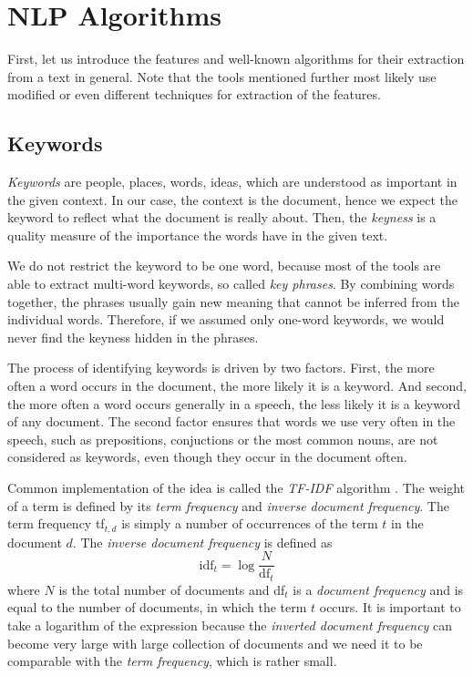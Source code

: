 \documentclass[
  digital, %
  table,   %
  lof,     %
  lot,     %
]{fithesis3}
\begin{document}
\section{NLP Algorithms}
First, let us introduce the features and well-known algorithms for their extraction from a text in general.
Note that the tools mentioned further most likely use modified or even different techniques for extraction of the features.

\subsection{Keywords}
\label{algorithms_keywords}
\emph{Keywords} are people, places, words, ideas, which are understood as important in the given context. 
In our case, the context is the document, hence we expect the keyword to reflect what the document is really about.
Then, the \textit{keyness} is a quality measure of the importance the words have in the given text.
\cite[ch. 4]{scott2006textual}

We do not restrict the keyword to be one word, because most of the tools are able to extract multi-word keywords, so called \textit{key phrases}.
By combining words together, the phrases usually gain new meaning that cannot be inferred from the individual words.
Therefore, if we assumed only one-word keywords, we would never find the keyness hidden in the phrases.

The process of identifying keywords is driven by two factors.
First, the more often a word occurs in the document, the more likely it is a keyword.
And second, the more often a word occurs generally in a speech, the less likely it is a keyword of any document.
\cite[ch. 4]{scott2006textual}
The second factor ensures that words we use very often in the speech, such as prepositions, conjuctions or the most common nouns, are not considered as keywords, even though they occur in the document often.

Common implementation of the idea is called the \textit{TF-IDF} algorithm \cite[ch. 6]{manning2008introduction}.
The weight of a term is defined by its \textit{term frequency} and \textit{inverse document frequency}.
The term frequency tf$_{t,d}$ is simply a number of occurrences of the term $t$ in the document $d$. The \textit{inverse document frequency} is defined as
$$
\text{idf}_t = \log{\frac{N}{\text{df}_t}}
$$
where $N$ is the total number of documents and df$_{t}$ is a \textit{document frequency} and is equal to the number of documents, in which the term $t$ occurs.
It is important to take a logarithm of the expression because the \textit{inverted document frequency} can become very large with large collection of documents and we need it to be comparable with the \textit{term frequency}, which is rather small.
\end{document}
